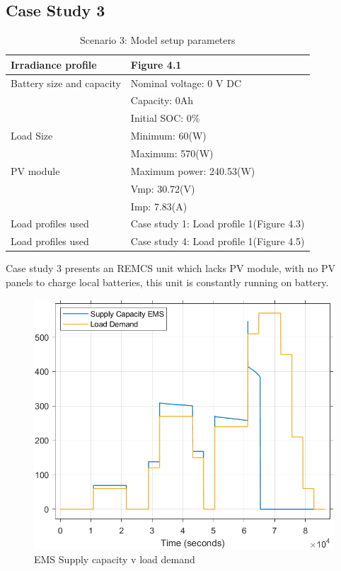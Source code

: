 \subsection{Case Study 3}
	\begin{table}[!ht]
	\begin{center}
		\caption{Scenario 3: Model setup parameters}
		\begin{tabular}{|p{6cm}|p{8cm}|} %
			\hline
			\textbf{Irradiance profile } & \textbf{Figure 4.1}\\
			\hline
			Battery size and capacity	& Nominal voltage: 0 V DC \\
			& Capacity: 0Ah\\
			& Initial SOC: 0\% \\
			\hline
			Load Size 					& Minimum: 60(W)\\
			& Maximum: 570(W)\\
			\hline
			PV module		 			& Maximum power: 240.53(W)\\
			& Vmp: 30.72(V)\\
			& Imp: 7.83(A)\\
			\hline
			Load profiles used & Case study 1: Load profile 1(Figure 4.3)\\
			\hline
			Load profiles used & Case study 4: Load profile 1(Figure 4.5)\\
			\hline
		\end{tabular}
	\end{center}
\end{table}
Case study 3 presents an REMCS unit which lacks PV module, with no PV panels to charge local batteries, this unit is constantly running on battery.
\begin{figure}[H]
	\centering
	\includegraphics[totalheight=8cm]{Figures/ems supply capacity v load demand2.png}
	\caption{EMS Supply capacity v load demand}
\end{figure}

